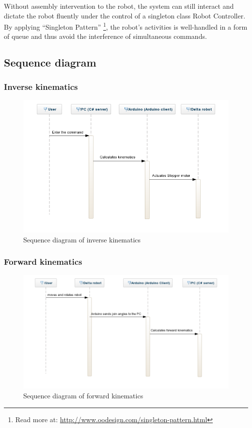 Without assembly intervention to the robot, the system can still interact and dictate the robot fluently under the control of a singleton class Robot Controller. By applying ``Singleton Pattern'' \footnote{Read more at: \url{http://www.oodesign.com/singleton-pattern.html}}, the robot's activities is well-handled in a form of queue and thus avoid the interference of simultaneous commands.

\subsection{Sequence diagram}
\subsubsection{Inverse kinematics}
\begin{figure}[H]
	\centering
	\includegraphics[width=\maxwidth{15cm}, keepaspectratio]{Chapters/Fig/inverse_kinematics_sequence_diagram.png}
	\caption{Sequence diagram of inverse kinematics}
	\label{fig:inverse_kinematics_sequence_diagram}
\end{figure}

\subsubsection{Forward kinematics}
\begin{figure}[H]
	\centering
	\includegraphics[width=\maxwidth{15cm}, keepaspectratio]{Chapters/Fig/forward_kinematics_sequence_diagram.png}
	\caption{Sequence diagram of forward kinematics}
	\label{fig:forward_kinematics_sequence_diagram}
\end{figure}

